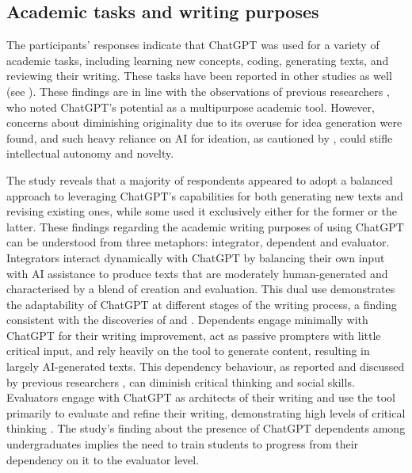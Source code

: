 \documentclass[english]{textolivre}
\begin{document}
\subsection{Academic tasks and writing purposes}
The participants’ responses indicate that ChatGPT was used for a variety of academic tasks, including learning new concepts, coding, generating texts, and reviewing their writing. These tasks have been reported in other studies as well (see \textcite{alkamel2024, crcek2023, higgs2024, klimova2024, punar2024}). These findings are in line with the observations of previous researchers \cite{robillos2024, teng2024a}, who noted ChatGPT’s potential as a multipurpose academic tool. However, concerns about diminishing originality due to its overuse for idea generation were found, and such heavy reliance on AI for ideation, as cautioned by \textcite{chia2024}, could stifle intellectual autonomy and novelty.

The study reveals that a majority of respondents appeared to adopt a balanced approach to leveraging ChatGPT’s capabilities for both generating new texts and revising existing ones, while some used it exclusively either for the former or the latter. These findings regarding the academic writing purposes of using ChatGPT can be understood from three metaphors: integrator, dependent and evaluator. Integrators interact dynamically with ChatGPT by balancing their own input with AI assistance to produce texts that are moderately human-generated and characterised by a blend of creation and evaluation. This dual use demonstrates the adaptability of ChatGPT at different stages of the writing process, a finding consistent with the discoveries of \textcite{mahapatra2024} and \textcite{xiao2023}. Dependents engage minimally with ChatGPT for their writing improvement, act as passive prompters with little critical input, and rely heavily on the tool to generate content, resulting in largely AI-generated texts. This dependency behaviour, as reported and discussed by previous researchers \cite{alkamel2024, klimova2024, mogavi2024, teng2024b, yuan2024}, can diminish critical thinking and social skills. Evaluators engage with ChatGPT as architects of their writing and use the tool primarily to evaluate and refine their writing, demonstrating high levels of critical thinking \cite{koltovskaia2024, lee2024}. The study’s finding about the presence of ChatGPT dependents among undergraduates implies the need to train students to progress from their dependency on it to the evaluator level.
\end{document}
